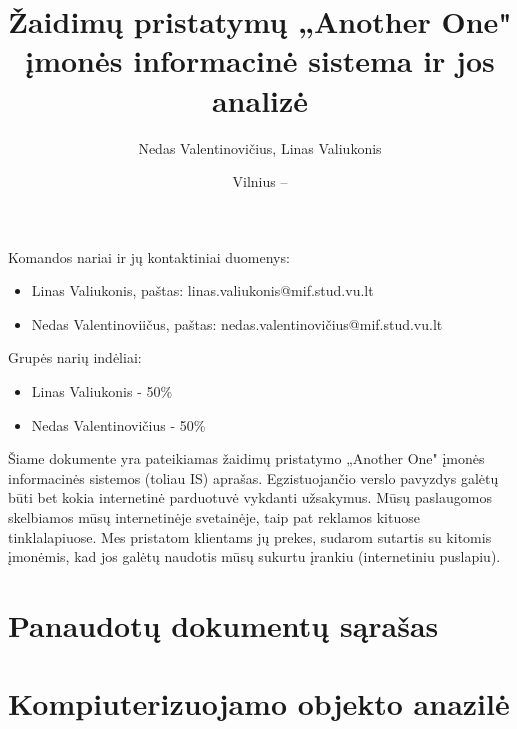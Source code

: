 \documentclass{VUMIFPSkursinis}
\title{Žaidimų pristatymų „Another One" įmonės informacinė sistema ir jos analizė}
\author{Nedas Valentinovičius, Linas Valiukonis}
\date{Vilnius – \the\year}
\begin{document}
	
\maketitle
\cleardoublepage{}
\setcounter{page}{2}

Komandos nariai ir jų kontaktiniai duomenys:
\begin{itemize}
	\item Linas Valiukonis, paštas: linas.valiukonis@mif.stud.vu.lt
	\item Nedas Valentinoviičus, paštas: nedas.valentinovičius@mif.stud.vu.lt
\end{itemize}
Grupės narių indėliai:
\begin {itemize}
	\item Linas Valiukonis - 50\%
	\item Nedas Valentinovičius - 50\%
\end{itemize}

\tableofcontents

Šiame dokumente yra pateikiamas žaidimų pristatymo „Another One" įmonės informacinės sistemos (toliau IS) aprašas. Egzistuojančio verslo pavyzdys galėtų būti bet kokia internetinė parduotuvė vykdanti užsakymus. Mūsų paslaugomos skelbiamos mūsų internetinėje svetainėje, taip pat reklamos kituose tinklalapiuose. Mes pristatom klientams jų prekes, sudarom sutartis su kitomis įmonėmis, kad jos galėtų naudotis mūsų sukurtu įrankiu (internetiniu puslapiu).

\section{Panaudotų dokumentų sąrašas}



\newpage
\section{Kompiuterizuojamo objekto anazilė}

\newpage
\end{document}
